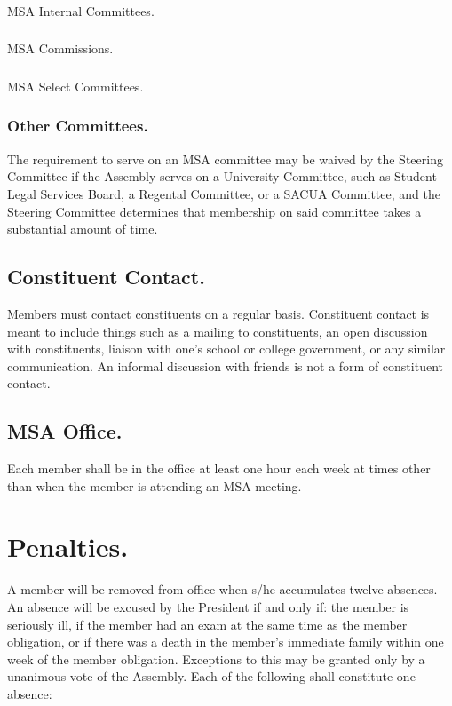 \documentclass{rules}
\begin{document}
\subsubsection{}
MSA Internal Committees.
\subsubsection{}
MSA Commissions.
\subsubsection{}
MSA Select Committees.
\subsubsection{Other Committees.}
The requirement to serve on an MSA committee may be waived by the Steering Committee if the Assembly serves on a University Committee, such as Student Legal Services Board, a Regental Committee, or a SACUA Committee, and the Steering Committee determines that membership on said committee takes a substantial amount of time.
\subsection{Constituent Contact.}
Members must contact constituents on a regular basis. Constituent contact is meant to include things such as a mailing to constituents, an open discussion with constituents, liaison with one's school or college government, or any similar communication. An informal discussion with friends is not a form of constituent contact.
\subsection{MSA Office.}
Each member shall be in the office at least one hour each week at times other than when the member is attending an MSA meeting.

\section{Penalties.}
A member will be removed from office when s/he accumulates twelve absences. An absence will be excused by the President if and only if: the member is seriously ill, if the member had an exam at the same time as the member obligation, or if there was a death in the member's immediate family within one week of the member obligation. Exceptions to this may be granted only by a unanimous vote of the Assembly. Each of the following shall constitute one absence:
\end{document}
